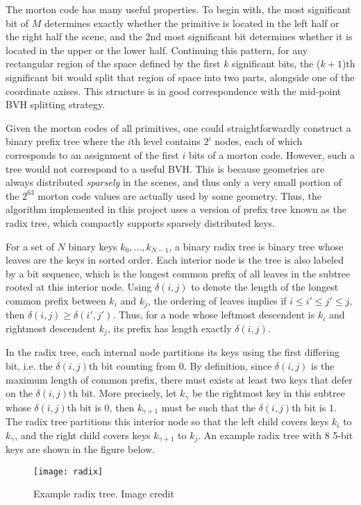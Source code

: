 \newpage
\thispagestyle{empty}
\enlargethispage{5\baselineskip}

The morton code has many useful properties. To begin with, the most significant bit of $M$ determines exactly whether the primitive is located in the left half or the right half the scene, and the 2nd most significant bit determines whether it is located in the upper or the lower half. Continuing this pattern, for any rectangular region of the space defined by the first $k$ significant bits, the ($k+1$)th significant bit would split that region of space into two parts, alongside one of the coordinate axises. This structure is in good correspondence with the mid-point BVH splitting strategy.


Given the morton codes of all primitives, one could straightforwardly construct a binary prefix tree where the $i$th level contains $2^i$ nodes, each of which corresponds to an assignment of the first $i$ bits of a morton code. However, such a tree would not correspond to a useful BVH. This is because geometries are always distributed \textit{sparsely} in the scenes, and thus only a very small portion of the $2^{63}$ morton code values are actually used by some geometry. Thus, the algorithm\cite{bvh_build} implemented in this project uses a version of prefix tree known as the radix tree, which compactly supports sparsely distributed keys.

For a set of $N$ binary keys $k_0,...,k_{N-1}$, a binary radix tree is binary tree whose leaves are the keys in sorted order. Each interior node is the tree is also labeled by a bit sequence, which is the longest common prefix of all leaves in the subtree rooted at this interior node. Using $\delta(i,j)$ to denote the length of the longest common prefix between $k_i$ and $k_j$, the ordering of leaves implies if $i\leq i'\leq j'\leq j$, then $\delta(i,j)\geq \delta(i',j')$. Thus, for a node whose leftmost descendent is $k_i$ and rightmost descendent $k_j$, its prefix has length exactly $\delta(i,j)$. 


In the radix tree, each internal node partitions its keys using the first differing bit, i.e. the $\delta(i,j)$th bit counting from 0. By definition, since $\delta(i,j)$ is the maximum length of common prefix, there must exists at least two keys that defer on the $\delta(i,j)$th bit. More precisely, let $k_{\gamma}$ be the rightmost key in this subtree whose $\delta(i,j)$th bit is $0$, then $k_{\gamma+1}$ must be such that the $\delta(i,j)$th bit is $1$. The radix tree partitions this interior node so that the left child covers keys $k_i$ to $k_\gamma$, and the right child covers keys $k_{\gamma+1}$ to $k_{j}$. An example radix tree with 8 5-bit keys are shown in the figure below.
\begin{figure}[H]
    \centering
    \texttt{[image: radix]}
    \caption{Example radix tree. Image credit \cite{bvh_build}}
    \label{image radix tree}
\end{figure} 



